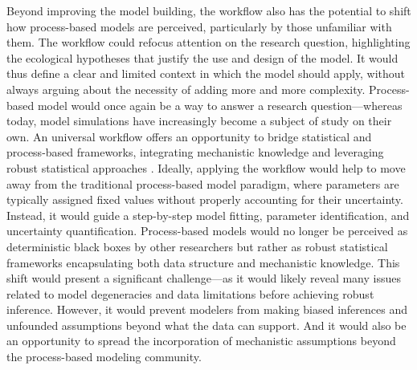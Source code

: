\documentclass[11pt]{article}
\begin{document}
Beyond improving the model building, the workflow also has the potential to shift how process-based models are perceived, particularly by those unfamiliar with them. The workflow could refocus attention on the research question, highlighting the ecological hypotheses that justify the use and design of the model. It would thus define a clear and limited context in which the model should apply, without always arguing about the necessity of adding more and more complexity.  %
Process-based model would once again be a way to answer a research question---whereas today, model simulations have increasingly become a subject of study on their own.
An universal workflow offers an opportunity to bridge statistical and process-based frameworks, integrating mechanistic knowledge and leveraging robust statistical approaches \citep[e.g.][]{rounce2020quantifying}.
Ideally, applying the workflow would help to move away from the traditional process-based model paradigm, where parameters are typically assigned fixed values without properly accounting for their uncertainty. Instead, it would guide a step-by-step model fitting, parameter identification, and uncertainty quantification. Process-based models would no longer be perceived as deterministic black boxes by other researchers but rather as robust statistical frameworks encapsulating both data structure and mechanistic knowledge. This shift would present a significant challenge---as it would likely reveal many issues related to model degeneracies and data limitations before achieving robust inference. However, it would prevent modelers from making biased inferences and unfounded assumptions beyond what the data can support. And it would also be an opportunity to spread the incorporation of mechanistic assumptions beyond the process-based modeling community.

\end{document}
